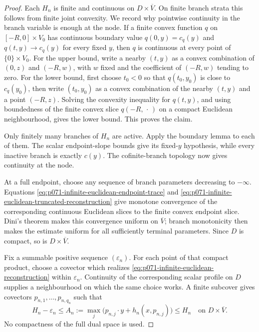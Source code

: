 \begin{proof}
Each $H_n$ is finite and continuous on
$D\times\overline V$.  On finite branch strata this follows from finite
joint convexity.  We record why pointwise continuity in the branch
variable is enough at the node.  If a finite convex function $q$ on
$[-R,0]\times V_0$ has continuous boundary value
$q(0,y)=c_q(y)$ and
$q(t,y)\to c_q(y)$ for every fixed $y$, then $q$ is continuous at
every point of $\{0\}\times V_0$.  For the upper bound, write a nearby
$(t,y)$ as a convex combination of $(0,z)$ and $(-R,w)$, with
$w$ fixed and the coefficient of $(-R,w)$ tending to zero.  For the
lower bound, first choose $t_0<0$ so that
$q(t_0,y_0)$ is close to $c_q(y_0)$, then write
$(t_0,y_0)$ as a convex combination of the nearby $(t,y)$ and a point
$(-R,z)$.  Solving the convexity inequality for $q(t,y)$, and using
boundedness of the finite convex slice $q(-R,\,\cdot\,)$ on a compact
Euclidean neighbourhood, gives the lower bound.  This proves the claim.

Only finitely many branches of $H_n$ are active.  Apply the boundary lemma
to each of them.  The scalar endpoint-slope bounds give its fixed-$y$
hypothesis, while every inactive branch is exactly $c(y)$.  The
cofinite-branch topology now gives continuity at the node.

At a full endpoint, choose any sequence of branch parameters decreasing to
$-\infty$.  Equations
\eqref{eq:p071-infinite-euclidean-endpoint-trace} and
\eqref{eq:p071-infinite-euclidean-truncated-reconstruction} give monotone
convergence of the corresponding continuous Euclidean slices to the finite
convex endpoint slice.  Dini's theorem makes this convergence uniform on
$\overline V$; branch monotonicity then makes the estimate uniform for all
sufficiently terminal parameters.  Since $D$ is compact, so is
$D\times\overline V$.

Fix a summable positive sequence $(\varepsilon_n)$.  For each point of
that compact product, choose a covector which realizes
\eqref{eq:p071-infinite-euclidean-reconstruction} within
$\varepsilon_n$.  Continuity of the corresponding scalar profile on
$D$ supplies a neighbourhood on which the same choice works.  A finite
subcover gives covectors $p_{n,1},\ldots,p_{n,q_n}$ such that
\begin{equation}
 H_n-\varepsilon_n\leq
 A_n:=\max_j\bigl(p_{n,j}\mathbin\cdot y
                 +h_n(x,p_{n,j})\bigr)
 \leq H_n
 \quad\text{on }D\times\overline V.
 \label{eq:p071-infinite-euclidean-finite-dual-sampling}
\end{equation}
No compactness of the full dual space is used.


\end{proof}
